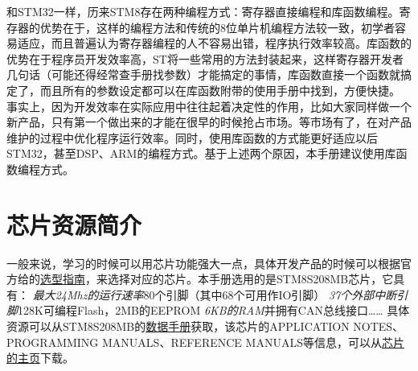 \documentclass[a4paper]{book}
\begin{document}
和STM32一样，历来STM8存在两种编程方式：寄存器直接编程和库函数编程。寄存器的优势在于，这样的编程方法和传统的8位单片机编程方法较一致，初学者容易适应，而且普遍认为寄存器编程的人不容易出错，程序执行效率较高。库函数的优势在于程序员开发效率高，ST将一些常用的方法封装起来，这样寄存器开发者几句话（可能还得经常查手册找参数）才能搞定的事情，库函数直接一个函数就搞定了，而且所有的参数设定都可以在库函数附带的使用手册中找到，方便快捷。 事实上，因为开发效率在实际应用中往往起着决定性的作用，比如大家同样做一个新产品，只有第一个做出来的才能在很早的时候抢占市场。等市场有了，在对产品维护的过程中优化程序运行效率。同时，使用库函数的方式能更好适应以后STM32，甚至DSP、ARM的编程方式。基于上述两个原因，本手册建议使用库函数编程方式。

\section{芯片资源简介}

一般来说，学习的时候可以用芯片功能强大一点，具体开发产品的时候可以根据官方给的\href{http://www.st.com/internet/com/SALES\_AND\_MARKETING\_RESOURCES/MARKETING\_COMMUNICATION/MARKETING\_BROCHURE/brstm8.pdf}{选型指南}，来选择对应的芯片。本手册选用的是STM8S208MB芯片，它具有： \emph{最大24Mhz的运行速率}80个引脚（其中68个可用作IO引脚） \emph{37个外部中断引脚}128K可编程Flash，2MB的EEPROM \emph{6KB的RAM}并拥有CAN总线接口\ldots{}\ldots{} 具体资源可以从STM8S208MB的\href{http://www.st.com/internet/com/TECHNICAL\_RESOURCES/TECHNICAL\_LITERATURE/DATASHEET/CD00197787.pdf}{数据手册}获取，该芯片的APPLICATION NOTES、PROGRAMMING MANUALS、REFERENCE MANUALS等信息，可以从\href{http://www.st.com/internet/mcu/product/190232.jsp}{芯片的主页}下载。
\end{document}
